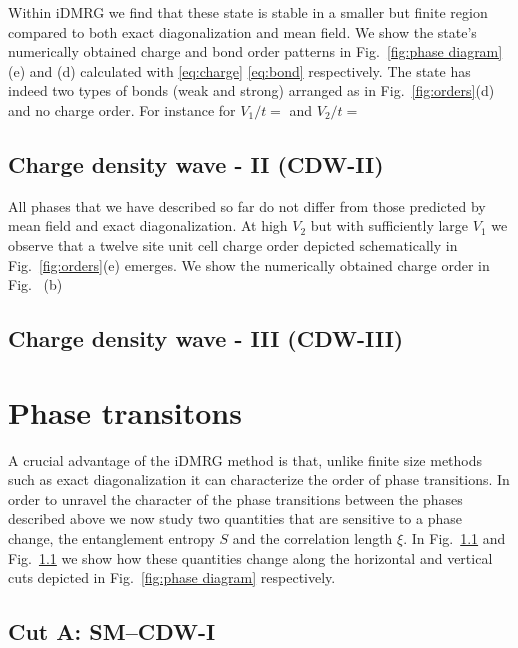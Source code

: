 \documentclass[aps,prx,10pt,twocolumn,floatfix,superscriptaddress,showpacs,numerical,footinbib]{revtex4-1}
\begin{document}
Within iDMRG we find that these state is stable in a smaller but finite region compared to both 
exact diagonalization and mean field.
%
We show the state's numerically obtained charge and bond order patterns in Fig.~\ref{fig:phase diagram}(e) and (d) 
calculated with \eqref{eq:charge} \eqref{eq:bond} respectively.
%
The state has indeed two types of bonds (weak and strong) arranged as in Fig.~\ref{fig:orders}(d) 
and no charge order.
%
For instance for $V_{1}/t=$ and $V_{2}/t=$



\subsection{Charge density wave - II (CDW-II)}
%
All phases that we have described so far do not differ
from those predicted by mean field and exact diagonalization.
%
At high $V_{2}$ but with sufficiently large $V_{1}$ we observe that
a twelve site unit cell charge order depicted schematically in 
Fig.~\ref{fig:orders}(e) emerges.
%
We show the numerically obtained charge order in 
Fig.~\cite{fig:phase diagram} (b)
%


\subsection{Charge density wave - III (CDW-III)}
%



\section{\label{sec:phasetransitions} Phase transitons}
%
A crucial advantage of the iDMRG method is that, unlike finite
size methods such as exact diagonalization it can characterize the order of phase transitions.
%
In order to unravel the character of the phase transitions between
the phases described above we now study two quantities that are sensitive
to a phase change, the entanglement entropy $S$ and the correlation length $\xi$.
%
In Fig.~\ref{}  and Fig.~\ref{} we show how these quantities change along
the horizontal and vertical cuts depicted in Fig.~\ref{fig:phase diagram} respectively.
%

\subsection{Cut A: SM--CDW-I}
\end{document}
